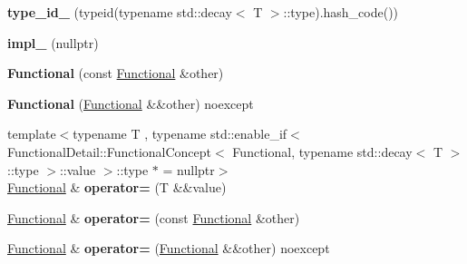 \begin{DoxyCompactItemize}
\item 
\hypertarget{classSpacy_1_1Functional_a0c1d2d3a24c7af11947b54e1634545a3}{{\bfseries type\-\_\-id\-\_\-} (typeid(typename std\-::decay$<$ \-T $>$\-::type).hash\-\_\-code())}\label{classSpacy_1_1Functional_a0c1d2d3a24c7af11947b54e1634545a3}

\item 
\hypertarget{classSpacy_1_1Functional_a446ce4a4656d4feb7df4d14d7b99dbfc}{{\bfseries impl\-\_\-} (nullptr)}\label{classSpacy_1_1Functional_a446ce4a4656d4feb7df4d14d7b99dbfc}

\item 
\hypertarget{classSpacy_1_1Functional_a412ab757206e9c17a5d3be5ad119f259}{{\bfseries \-Functional} (const \hyperlink{classSpacy_1_1Functional}{\-Functional} \&other)}\label{classSpacy_1_1Functional_a412ab757206e9c17a5d3be5ad119f259}

\item 
\hypertarget{classSpacy_1_1Functional_acc54a58265520b36b731fceecc4a1c4c}{{\bfseries \-Functional} (\hyperlink{classSpacy_1_1Functional}{\-Functional} \&\&other) noexcept}\label{classSpacy_1_1Functional_acc54a58265520b36b731fceecc4a1c4c}

\item 
\hypertarget{classSpacy_1_1Functional_a90fe7e1ba7e375f6bb8875b9e927a8d7}{{\footnotesize template$<$typename T , typename std\-::enable\-\_\-if$<$ Functional\-Detail\-::\-Functional\-Concept$<$ Functional, typename std\-::decay$<$ T $>$\-::type $>$\-::value $>$\-::type $\ast$  = nullptr$>$ }\\\hyperlink{classSpacy_1_1Functional}{\-Functional} \& {\bfseries operator=} (\-T \&\&value)}\label{classSpacy_1_1Functional_a90fe7e1ba7e375f6bb8875b9e927a8d7}

\item 
\hypertarget{classSpacy_1_1Functional_a67ea20b009963ddd56cae82a6ddf620a}{\hyperlink{classSpacy_1_1Functional}{\-Functional} \& {\bfseries operator=} (const \hyperlink{classSpacy_1_1Functional}{\-Functional} \&other)}\label{classSpacy_1_1Functional_a67ea20b009963ddd56cae82a6ddf620a}

\item 
\hypertarget{classSpacy_1_1Functional_ab4d6af3a14920177cbe2610a9951ad88}{\hyperlink{classSpacy_1_1Functional}{\-Functional} \& {\bfseries operator=} (\hyperlink{classSpacy_1_1Functional}{\-Functional} \&\&other) noexcept}\label{classSpacy_1_1Functional_ab4d6af3a14920177cbe2610a9951ad88}


\end{DoxyCompactItemize}
